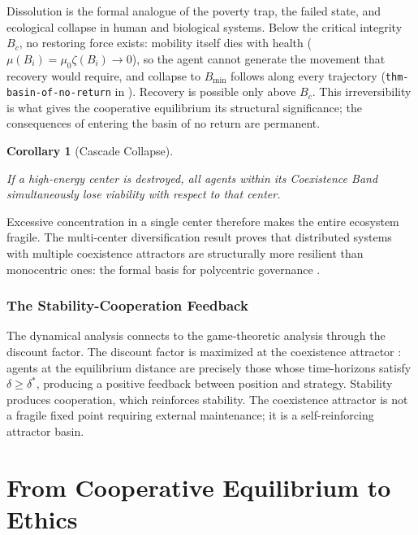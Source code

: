 \documentclass[11pt]{article}
\theoremstyle{plain}
\newtheorem{corollary}[theorem]{Corollary}
\theoremstyle{definition}
\theoremstyle{remark}
\let\origsection\section
\renewcommand{\section}{\needspace{12\baselineskip}\origsection}
\let\origsubsubsection\subsubsection
\renewcommand{\subsubsection}{\needspace{4\baselineskip}\origsubsubsection}
\begin{document}
Dissolution is the formal analogue of the poverty trap, the failed
state, and ecological collapse in human and biological systems. Below
the critical integrity \(B_c\), no restoring force exists: mobility
itself dies with health (\(\mu(B_i) = \mu_0 \zeta(B_i) \to 0\)), so the
agent cannot generate the movement that recovery would require, and
collapse to \(B_{\min}\) follows along every trajectory
(\texttt{thm-basin-of-no-return} in \citep{TC-VI}). Recovery is possible
only above \(B_c\). This irreversibility is what gives the cooperative
equilibrium its structural significance; the consequences of entering
the basin of no return are permanent.

\begin{corollary}[Cascade Collapse]
\label{ethics-cor-cascade}

If a high-energy center is destroyed, all agents within its Coexistence Band simultaneously lose viability with respect to that center. \citep{TC-VI}
\end{corollary}

Excessive concentration in a single center therefore makes the entire
ecosystem fragile. The multi-center diversification result \citep{TC-VI}
proves that distributed systems with multiple coexistence attractors are
structurally more resilient than monocentric ones: the formal basis for
polycentric governance \citep{Ostrom1990, Ostrom2005}.

\subsubsection{The Stability-Cooperation
Feedback}\label{the-stability-cooperation-feedback}

The dynamical analysis connects to the game-theoretic analysis through
the discount factor. The discount factor is maximized at the coexistence
attractor \citep{TC-VI}: agents at the equilibrium distance are
precisely those whose time-horizons satisfy \(\delta \geq \delta^*\),
producing a positive feedback between position and strategy. Stability
produces cooperation, which reinforces stability. The coexistence
attractor is not a fragile fixed point requiring external maintenance;
it is a self-reinforcing attractor basin.

\section{From Cooperative Equilibrium to
Ethics}\label{from-cooperative-equilibrium-to-ethics}
\end{document}
